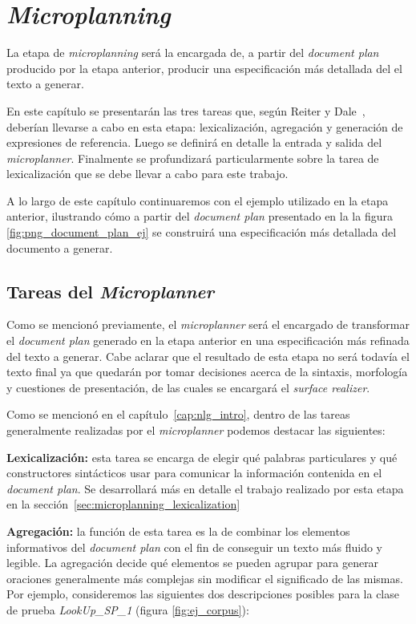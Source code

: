 \chapter{\textit{Microplanning}}
\label{cap:microplanning}

La etapa de \textit{microplanning} será la encargada de, a partir del \textit{document plan} producido por la etapa anterior, producir una especificación más detallada del el texto a generar. 

En este capítulo se presentarán las tres tareas que, según Reiter y Dale~\cite{reiter_dale}, deberían llevarse a cabo en esta etapa: lexicalización, agregación y generación de expresiones de referencia. Luego se definirá en detalle la entrada y salida del \textit{microplanner}. Finalmente se profundizará particularmente sobre la tarea de lexicalización que se debe llevar a cabo para este trabajo.

A lo largo de este capítulo continuaremos con el ejemplo utilizado en la etapa anterior, ilustrando cómo a partir del \textit{document plan} presentado en la la figura \ref{fig:png_document_plan_ej} se construirá una especificación más detallada del documento a generar.

\section{Tareas del \textit{Microplanner}}

Como se mencionó previamente, el \textit{microplanner} será el encargado de transformar el \textit{document plan} generado en la etapa anterior en una especificación más refinada del texto a generar. Cabe aclarar que el resultado de esta etapa no será todavía el texto final ya que quedarán por tomar decisiones acerca de la sintaxis, morfología y cuestiones de presentación, de las cuales se encargará el \textit{surface realizer}.

Como se mencionó en el capítulo~\ref{cap:nlg_intro}, dentro de las tareas generalmente realizadas por el \emph{microplanner} podemos destacar las siguientes:

\medskip
\noindent
\textbf{Lexicalización:} esta tarea se encarga de elegir qué palabras particulares y qué constructores sintácticos usar para comunicar la información contenida en el \textit{document plan}. Se desarrollará más en detalle el trabajo realizado por esta etapa en la sección~\ref{sec:microplanning_lexicalization}


\medskip
\noindent
\textbf{Agregación:} la función de esta tarea es la de combinar los elementos informativos del \emph{document plan} con el fin de conseguir un texto más fluido y legible. La agregación decide qué elementos se pueden agrupar para generar oraciones generalmente más complejas sin modificar el significado de las mismas. Por ejemplo, consideremos las siguientes dos descripciones posibles para la clase de prueba \emph{LookUp\_SP\_1} (figura \ref{fig:ej_corpus}):


